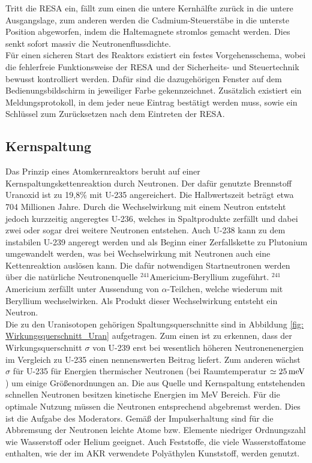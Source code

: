 	Tritt die RESA ein, fällt zum einen die untere Kernhälfte zurück in die untere Ausgangslage, zum anderen werden die Cadmium-Steuerstäbe in die unterste Position abgeworfen, indem die Haltemagnete stromlos gemacht werden. Dies senkt sofort massiv die Neutronenflussdichte.\\
	Für einen sicheren Start des Reaktors existiert ein festes Vorgehensschema, wobei die fehlerfreie Funktionsweise der RESA und der Sicherheits- und Steuertechnik bewusst kontrolliert werden. Dafür sind die dazugehörigen Fenster auf dem Bedienungsbildschirm in jeweiliger Farbe gekennzeichnet. Zusätzlich existiert ein Meldungsprotokoll, in dem jeder neue Eintrag bestätigt werden muss, sowie ein Schlüssel zum Zurücksetzen nach dem Eintreten der RESA.
	
	\subsection{Kernspaltung}
	Das Prinzip eines Atomkernreaktors beruht auf einer Kernspaltungskettenreaktion durch Neutronen. Der dafür genutzte Brennstoff Uranoxid ist zu 19,8\% mit U-235 angereichert. Die Halbwertszeit beträgt etwa 704 Millionen Jahre. Durch die Wechselwirkung mit einem Neutron entsteht jedoch kurzzeitig angeregtes U-236, welches in Spaltprodukte zerfällt und dabei zwei oder sogar drei weitere Neutronen entstehen. Auch U-238 kann zu dem instabilen U-239 angeregt werden und als Beginn einer Zerfallskette zu Plutonium umgewandelt werden, was bei Wechselwirkung mit Neutronen auch eine Kettenreaktion auslösen kann. Die dafür notwendigen Startneutronen werden über die natürliche Neutronenquelle $ ^{241} $Americium-Beryllium zugeführt. $ ^{241} $Americium zerfällt unter Aussendung von $\alpha$-Teilchen, welche wiederum mit Beryllium wechselwirken. Als Produkt dieser Wechselwirkung entsteht ein Neutron.\\
	Die zu den Uranisotopen gehörigen Spaltungsquerschnitte sind in Abbildung \ref{fig: Wirkungsquerschnitt_Uran} aufgetragen. Zum einen ist zu erkennen, dass der Wirkungsquerschnitt $\sigma$ von U-239 erst bei wesentlich höheren Neutronenenergien im Vergleich zu U-235 einen nennenswerten Beitrag liefert. Zum anderen wächst $\sigma$ für U-235 für Energien thermischer Neutronen (bei Raumtemperatur $ \simeq \unit[25]{meV} $) um einige Größenordnungen an. Die aus Quelle und Kernspaltung entstehenden schnellen Neutronen besitzen kinetische Energien im MeV Bereich. Für die optimale Nutzung müssen die Neutronen entsprechend abgebremst werden. Dies ist die Aufgabe des Moderators. Gemäß der Impulserhaltung sind für die Abbremsung der Neutronen leichte Atome bzw. Elemente niedriger Ordnungszahl wie Wasserstoff oder Helium geeignet. Auch Feststoffe, die viele Wasserstoffatome enthalten, wie der im AKR verwendete Polyäthylen Kunststoff, werden genutzt.\\
